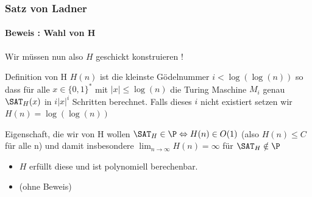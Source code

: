 \begin{frame}
	\frametitle{Satz von Ladner}
	\framesubtitle{Beweis : Wahl von H}
	Wir müssen nun also $H$ geschickt konstruieren !
	\pause
	\begin{KITinfoblock}{Definition von H}
		$H(n)$ ist die kleinste Gödelnummer $i < \log (\log (n))$ so dass für alle
		$ x \in \{0,1\}^*$ mit $|x| \leq \log(n) $ die Turing Maschine $M_i$ genau ${\SAT}_H(x)$
		in $i|x|^i$ Schritten berechnet. Falls dieses $i$ nicht existiert setzen wir 
		$H(n) = \log(\log(n))$ 
	\end{KITinfoblock}
	\pause
	\bigskip
	\begin{KITblock}{Eigenschaft, die wir von H wollen}
		${\SAT}_H \in \P \Leftrightarrow H(n) \in O(1)$ (also $H(n) \leq C$ f\"ur alle n) 				\newline
		und damit insbesondere $\lim_{n \to \infty}  H(n) = \infty$ f\"ur ${\SAT}_H
		\notin \P$
	\end{KITblock}
	\pause
	\begin{itemize}
	  \item  $H$ erfüllt diese und ist polynomiell berechenbar.
		  \item (ohne Beweis)
	\end{itemize}
		
\end{frame}
% 	
